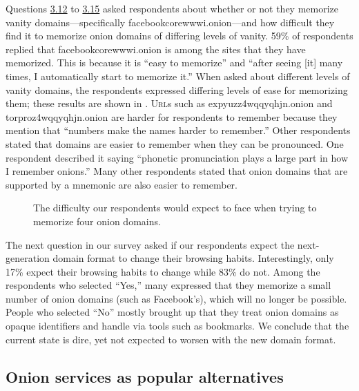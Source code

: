 Questions \hyperref[q3_12]{3.12} to \hyperref[q3_15]{3.15} asked respondents
about whether or not they memorize vanity domains---specifically
facebookcorewwwi.onion---and how difficult they find it to memorize onion
domains of differing levels of vanity.  59\% of respondents replied that
facebookcorewwwi.onion is among the sites that they have memorized.  This is
because it is ``easy to memorize'' and ``after seeing [it] many times, I
automatically start to memorize it.''  When asked about different levels of
vanity domains, the respondents expressed differing levels of ease for
memorizing them; these results are shown in .
\textsc{Url}s such as expyuzz4wqqyqhjn.onion and torproz4wqqyqhjn.onion are
harder for respondents to remember because they mention that ``numbers make the
names harder to remember.''  Other respondents stated that domains are easier to
remember when they can be pronounced.  One respondent described it saying
``phonetic pronunciation plays a large part in how I remember onions.'' Many
other respondents stated that onion domains that are supported by a mnemonic are
also easier to remember.  

\begin{figure}[t]
    \centering
    
    \caption{The difficulty our respondents would expect to face when trying to
    memorize four onion domains.}
    \label{fig:memorize-domains}
\end{figure}

The next question in our survey asked if our respondents expect the
next-generation domain format to change their browsing habits.  Interestingly,
only 17\% expect their browsing habits to change while 83\% do not.  Among the
respondents who selected ``Yes,'' many expressed that they memorize a small
number of onion domains (such as Facebook's), which will no longer be possible.
People who selected ``No'' mostly brought up that they treat onion domains as
opaque identifiers and handle via tools such as bookmarks.  We conclude that the
current state is dire, yet not expected to worsen with the new domain format.

\subsection{Onion services as popular alternatives}

